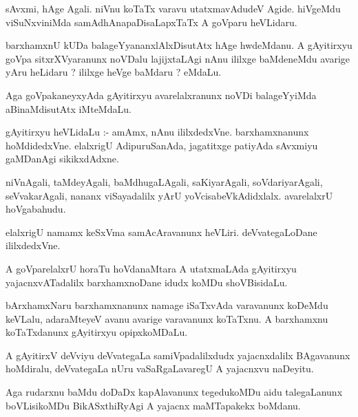 \documentclass{article}
\begin{document}
\begin{mn}
sAvxmi, hAge Agali.  niVnu koTaTx varavu utatxmavAdudeV Agide.  hiVgeMdu 
viSuNxviniMda samAdhAnapaDisaLapxTaTx A goVparu heVLidaru. 
\end{mn}

\begin{mn}
barxhamxnU kUDa balageYyananxlAlxDisutAtx  hAge hwdeMdanu.  A gAyitirxyu goVpa sitxrXVyaranunx  noVDalu  
lajijxtaLAgi nAnu ililxge baMdeneMdu avarige yAru heLidaru ? ililxge heVge baMdaru ?  eMdaLu.
\end{mn}

\begin{mn}
Aga goVpakaneyxyAda gAyitirxyu  avarelalxranunx  noVDi balageYyiMda aBinaMdisutAtx  iMteMdaLu.
\end{mn}

\begin{mn}
gAyitirxyu heVLidaLu :- amAmx,  nAnu ililxdedxVne.  barxhamxnanunx  hoMdidedxVne.  
elalxrigU AdipuruSanAda, jagatitxge patiyAda sAvxmiyu gaMDanAgi sikikxdAdxne.
\end{mn}

\begin{mn}
niVnAgali, taMdeyAgali, baMdhugaLAgali, saKiyarAgali, soVdariyarAgali,  seVvakarAgali, 
nananx  viSayadalilx  yArU  yoVcisabeVkAdidxlalx. avarelalxrU hoVgabahudu.
\end{mn}

\begin{mn}
elalxrigU namamx keSxVma samAcAravanunx heVLiri.  deVvategaLoDane  ililxdedxVne.
\end{mn}

\begin{mn}
A goVparelalxrU horaTu hoVdanaMtara A utatxmaLAda gAyitirxyu yajacnxvATadalilx 
barxhamxnoDane idudx koMDu shoVBisidaLu.
\end{mn}

\begin{mn}
bArxhamxNaru barxhamxnanunx namage iSaTxvAda varavanunx koDeMdu keVLalu, adaraMteyeV avanu 
avarige  varavanunx koTaTxnu.  A barxhamxnu  koTaTxdanunx  gAyitirxyu opipxkoMDaLu.
\end{mn}

\begin{mn}
A gAyitirxV  deVviyu deVvategaLa  samiVpadalilxdudx  yajacnxdalilx BAgavanunx  
hoMdiralu, deVvategaLa nUru vaSaRgaLavaregU  A yajacnxvu naDeyitu.
\end{mn}

\begin{mn}
Aga rudarxnu baMdu  doDaDx kapAlavanunx  tegedukoMDu aidu talegaLanunx boVLisikoMDu  
BikASxthiRyAgi A yajacnx maMTapakekx boMdanu.
\end{mn}
\end{document}
